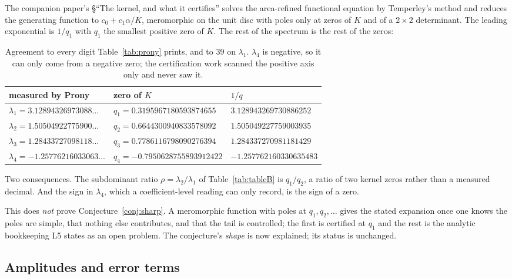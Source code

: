 \documentclass[11pt]{article}
\begin{document}
The companion paper's \S``The kernel, and what it certifies'' solves the
area-refined functional equation by Temperley's method and reduces the
generating function to $c_0 + c_1\alpha/K$, meromorphic on the unit disc with
poles only at zeros of $K$ and of a $2\times2$ determinant. The leading
exponential is $1/q_1$ with $q_1$ the smallest positive zero of $K$. The rest
of the spectrum is the rest of the zeros:

\begin{table}[H]
\centering\small
\begin{tabular}{l l l}
\toprule
measured by Prony & zero of $K$ & $1/q$ \\
\midrule
$\lambda_1 = 3.12894326973088\dots$ & $q_1 = 0.3195967180593874655$ & $3.128943269730886252$ \\
$\lambda_2 = 1.50504922775900\dots$ & $q_2 = 0.6644300940833578092$ & $1.505049227759003935$ \\
$\lambda_3 = 1.28433727098118\dots$ & $q_3 = 0.7786116798090276394$ & $1.284337270981181429$ \\
$\lambda_4 = -1.25776216033063\dots$ & $q_4 = -0.7950628755893912422$ & $-1.257762160330635483$ \\
\bottomrule
\end{tabular}
\caption{Agreement to every digit Table~\ref{tab:prony} prints, and to $39$ on
$\lambda_1$. $\lambda_4$ is negative, so it can only come from a negative zero;
the certification work scanned the positive axis only and never saw it.}
\label{tab:kernelzeros}
\end{table}

Two consequences. The subdominant ratio $\rho = \lambda_2/\lambda_1$ of
Table~\ref{tab:tableB} is $q_1/q_2$, a ratio of two kernel zeros rather than a
measured decimal. And the sign in $\lambda_4$, which a coefficient-level reading
can only record, is the sign of a zero.

This does \emph{not} prove Conjecture~\ref{conj:sharp}. A
meromorphic function with poles at $q_1, q_2, \dots$ gives the stated expansion
once one knows the poles are simple, that nothing else contributes, and that the
tail is controlled; the first is certified at $q_1$ and the rest is the analytic
bookkeeping L5 states as an open problem. The conjecture's \emph{shape} is now
explained; its status is unchanged.

\subsection{Amplitudes and error terms}
\label{sec:notbuy}
\end{document}
